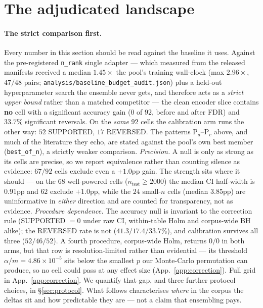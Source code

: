 \documentclass[11pt]{article}
\begin{document}
\section{The adjudicated landscape}
\label{sec:findings}

\paragraph{The strict comparison first.} Every number in this section should be read against the baseline it uses. Against the pre-registered \texttt{n\_rank} single adapter --- which measured from the released manifests received a median $1.45\times$ the pool's training wall-clock (max $2.96\times$, $47/48$ pairs; \texttt{analysis/\allowbreak baseline\_\allowbreak budget\_\allowbreak audit.\allowbreak json}) plus a held-out hyperparameter search the ensemble never gets, and therefore acts as a \emph{strict upper bound} rather than a matched competitor --- the clean encoder slice contains \textbf{no} cell with a significant accuracy gain ($0$ of $92$, before and after FDR) and $33.7\%$ significant reversals. On the \emph{same} $92$ cells the calibration arm runs the other way: $52$ SUPPORTED, $17$ REVERSED. The patterns P$_a$--P$_c$ above, and much of the literature they echo, are stated against the pool's own best member (\texttt{best\_of\_n}), a strictly weaker comparison. \emph{Precision.} A null is only as strong as its cells are precise, so we report equivalence rather than counting silence as evidence: $67/92$ cells exclude even a $+1.0$pp gain. The strength sits where it should --- on the $68$ well-powered cells ($n_{\text{test}}\!\geq\!2000$) the median CI half-width is $0.91$pp and $62$ exclude $+1.0$pp, while the $24$ small-$n$ cells (median $3.85$pp) are uninformative in \emph{either} direction and are counted for transparency, not as evidence. \emph{Procedure dependence.} The accuracy null is invariant to the correction rule (SUPPORTED $=0$ under raw CI, within-table Holm and corpus-wide BH alike); the REVERSED rate is not ($41.3/17.4/33.7\%$), and calibration survives all three ($52/46/52$). A fourth procedure, corpus-wide Holm, returns $0/0$ in both arms, but that row is resolution-limited rather than evidential --- its threshold $\alpha/m{=}4.86{\times}10^{-5}$ sits below the smallest $p$ our Monte-Carlo permutation can produce, so no cell could pass at any effect size (App.~\ref{app:correction}). Full grid in App.~\ref{app:correction}. We quantify that gap, and three further protocol choices, in \S\ref{sec:protocol}. What follows characterises \emph{where} in the corpus the deltas sit and how predictable they are --- not a claim that ensembling pays.
\end{document}
